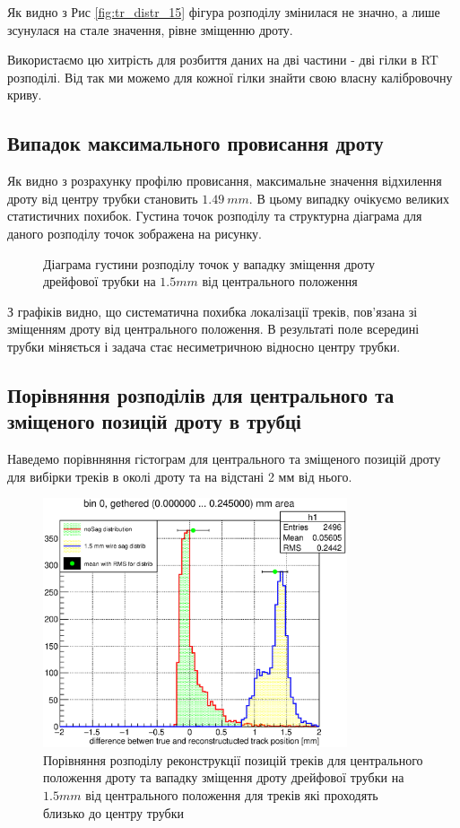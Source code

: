 \documentclass[]{article}
\begin{document}
	Як видно з Рис \ref{fig:tr_distr_15} фігура розподілу змінилася не значно, а лише зсунулася на стале значення, рівне зміщенню дроту.
	
	Використаємо цю хитрість для розбиття даних на дві частини - дві гілки в RT розподілі. Від так ми можемо для  кожної гілки знайти свою власну калібровочну криву.
	
	\subsection{ Випадок максимального провисання дроту}
	Як видно з розрахунку профілю провисання, максимальне значення відхилення дроту від центру трубки становить $1.49~mm$. В цьому випадку очікуємо великих статистичних похибок. Густина точок розподілу та структурна діаграма для даного розподілу точок зображена на рисунку.
	
	\begin{figure}[h!]
	\centering
	\caption{ Діаграма густини розподілу точок у вападку зміщення дроту дрейфової трубки на $1.5 mm$ від центрального положення}
	\end{figure}
	
	З графіків видно, що систематична похибка локалізації треків, пов’язана зі зміщенням дроту від центрального положення.
	В результаті поле всередині трубки міняється і задача стає несиметричною відносно центру трубки.
	
	\subsection{ Порівняння розподілів для центрального та зміщеного позицій дроту в трубці}	
	Наведемо порівнняння гістограм для центрального та зміщеного позицій дроту для вибірки треків в околі дроту та на відстані 2 мм від нього.
	
	\begin{figure}[h!]
	\includegraphics[width=0.8\textwidth]{bin0_0mm.eps}
	\centering
	\caption{ Порівняння розподілу реконструкції позицій треків для центрального положення дроту та вападку зміщення дроту дрейфової трубки на $1.5 mm$ від центрального положення для треків які проходять близько до центру трубки}
	\end{figure}
	
\end{document}
